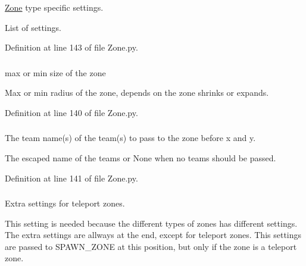 \hyperlink{class_zone_1_1_zone}{Zone} type specific settings. 

List of settings. 

Definition at line 143 of file Zone.py.

\hypertarget{class_zone_1_1_zone_a9962b673a138b53b1631158d18cf5279}{
\subsubsection[{target\_\-size}]{}}
\label{class_zone_1_1_zone_a9962b673a138b53b1631158d18cf5279}


max or min size of the zone 

Max or min radius of the zone, depends on the zone shrinks or expands. 

Definition at line 140 of file Zone.py.

\hypertarget{class_zone_1_1_zone_a0f3f8429ae8a37672f700da3f2805a91}{
\subsubsection[{teamnames}]{}}
\label{class_zone_1_1_zone_a0f3f8429ae8a37672f700da3f2805a91}


The team name(s) of the team(s) to pass to the zone before x and y. 

The escaped name of the teams or None when no teams should be passed. 

Definition at line 141 of file Zone.py.

\hypertarget{class_zone_1_1_zone_a2b9ae272876347626e25ead4d48f9a97}{
\subsubsection[{teleport\_\-settings}]{}}
\label{class_zone_1_1_zone_a2b9ae272876347626e25ead4d48f9a97}


Extra settings for teleport zones. 

This setting is needed because the different types of zones has different settings. The extra settings are allways at the end, except for teleport zones. This settings are passed to SPAWN\_\-ZONE at this position, but only if the zone is a teleport zone. 

